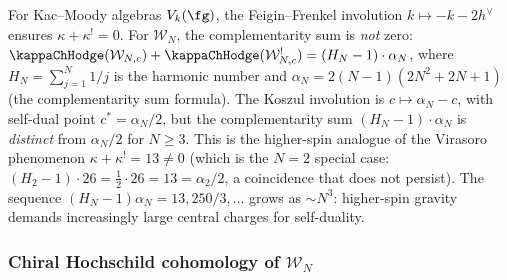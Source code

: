 \begin{remark}
\label{rem:wn-complementarity-nonzero}
%
For Kac--Moody algebras $V_k(\fg)$, the Feigin--Frenkel
involution $k \mapsto -k - 2h^\vee$ ensures
$\kappa + \kappa^! = 0$. For $\mathcal{W}_N$,
the complementarity sum is \emph{not} zero:
$\kappaChHodge(\mathcal{W}_{N,c}) + \kappaChHodge(\mathcal{W}_{N,c}^!)
= (H_N - 1) \cdot \alpha_N$, where $H_N = \sum_{j=1}^N 1/j$
is the harmonic number and $\alpha_N = 2(N{-}1)(2N^2{+}2N{+}1)$
\textup{(}the complementarity sum formula\textup{)}.
The Koszul involution is $c \mapsto \alpha_N - c$, with
self-dual point $c^* = \alpha_N/2$, but the complementarity sum
$(H_N - 1) \cdot \alpha_N$ is \emph{distinct} from $\alpha_N/2$
for $N \geq 3$.
This is the higher-spin analogue of the Virasoro phenomenon
$\kappa + \kappa^! = 13 \ne 0$
\textup{(}which is the $N = 2$ special case:
$(H_2 - 1) \cdot 26 = \tfrac{1}{2} \cdot 26 = 13 = \alpha_2/2$,
a coincidence that does not persist\textup{)}.
The sequence $(H_N - 1)\alpha_N = 13, 250/3, \ldots$ grows
as $\sim N^3$: higher-spin gravity demands
increasingly large central charges for
self-duality.
\end{remark}

\subsubsection{Chiral Hochschild cohomology of $\mathcal{W}_N$}
\label{subsubsec:wn-hochschild}

